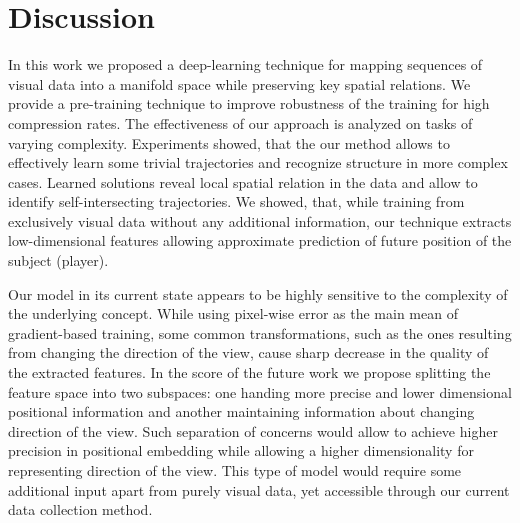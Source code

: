 
\chapter{Discussion}
\label{ch:conc}

In this work we proposed a deep-learning technique for mapping sequences of visual data into a manifold space while preserving key spatial relations.
We provide a pre-training technique to improve robustness of the training for high compression rates.
The effectiveness of our approach is analyzed on tasks of varying complexity.
Experiments showed, that the our method allows to effectively learn some trivial trajectories and recognize structure in more complex cases.
Learned solutions reveal local spatial relation in the data and allow to identify self-intersecting trajectories.
We showed, that, while training from exclusively visual data without any additional information, our technique extracts low-dimensional features allowing approximate prediction of future position of the subject (player).

Our model in its current state appears to be highly sensitive to the complexity of the underlying concept. While using pixel-wise error as the main mean of gradient-based training, some common transformations, such as the ones resulting from changing the direction of the view, cause sharp decrease in the quality of the extracted features. In the score of the future work we propose splitting the feature space into two subspaces: one handing more precise and lower dimensional positional information and another maintaining information about changing direction of the view. Such separation of concerns would allow to achieve higher precision in positional embedding while allowing a higher dimensionality for representing direction of the view. This type of model would require some additional input apart from purely visual data, yet accessible through our current data collection method.
